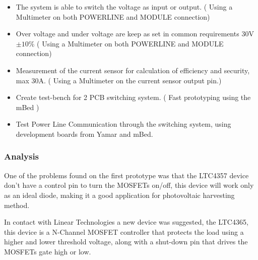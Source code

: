 \begin{itemize}
	\item The system is able to switch the voltage as input or output. ( Using a Multimeter on both POWERLINE and MODULE connection)
	\item Over voltage and under voltage are keep as set in common requirements 30V $ \pm10\% $ ( Using a Multimeter on both POWERLINE and MODULE connection)
	\item Measurement of the current sensor for calculation of efficiency and security, max 30A. ( Using a Multimeter on the current sensor output pin.)
	\item Create test-bench for 2 PCB switching system. ( Fast prototyping using the mBed )
	\item Test Power Line Communication through the switching system, using development boards from Yamar and mBed.
\end{itemize}
%
%
\subsubsection{Analysis}
%
%
%
One of the problems found on the first prototype was that the LTC4357 device don't have a control pin to turn the MOSFETs on/off, this device will work only as an ideal diode, making it a good application for photovoltaic harvesting method.

In contact with Linear Technologies a new device was suggested, the LTC4365, this device is a N-Channel MOSFET controller that protects the load using a higher and lower threshold voltage, along with a shut-down pin that drives the MOSFETs gate high or low.

